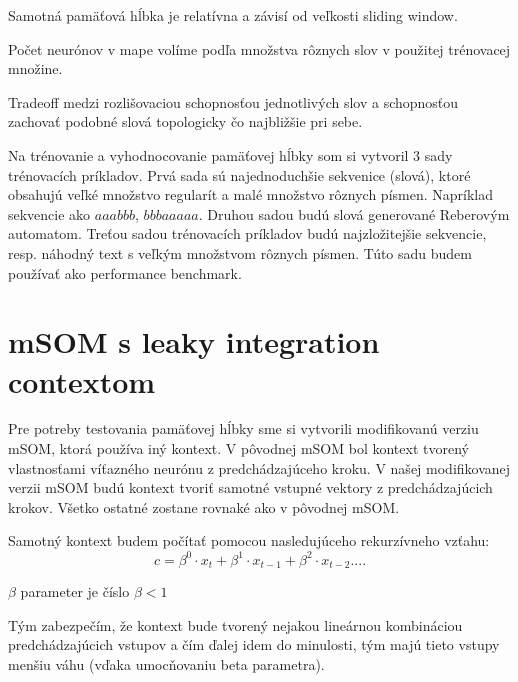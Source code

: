 Samotná pamäťová hĺbka je relatívna a závisí od veľkosti sliding window.

Počet neurónov v mape volíme podľa množstva rôznych slov v použitej trénovacej
množine.

Tradeoff medzi rozlišovaciou schopnosťou jednotlivých slov a schopnosťou
zachovať podobné slová topologicky čo najbližšie pri sebe.

Na trénovanie a vyhodnocovanie pamäťovej hĺbky som si vytvoril 3 sady 
trénovacích príkladov. 
Prvá sada sú najednoduchšie sekvenice (slová), ktoré obsahujú veľké množstvo regularít a malé množstvo rôznych písmen.
Napríklad sekvencie ako $aaabbb$,  $bbbaaaaa$.
Druhou sadou budú slová generované Reberovým automatom.
Treťou sadou trénovacích príkladov budú najzložitejšie sekvencie, resp. náhodný text s
veľkým množstvom rôznych písmen. Túto sadu budem používať ako performance benchmark. 

\section{mSOM s leaky integration contextom}
Pre potreby testovania pamäťovej hĺbky sme si vytvorili modifikovanú verziu mSOM, ktorá používa iný kontext.
V pôvodnej mSOM bol kontext tvorený vlastnosťami víťazného neurónu z predchádzajúceho kroku.
V našej modifikovanej verzii mSOM budú kontext tvoriť samotné vstupné vektory z predchádzajúcich krokov.
Všetko ostatné zostane rovnaké ako v pôvodnej mSOM.

Samotný kontext budem počítať pomocou nasledujúceho rekurzívneho vzťahu:
\begin{equation}
	c = \beta^{0} \cdot x_{t} + \beta^{1} \cdot x_{t-1} + 
	\beta^{2} \cdot x_{t-2}....
\end{equation}

$\beta$ parameter je číslo $\beta < 1$

Tým zabezpečím, že kontext bude tvorený nejakou lineárnou kombináciou 
predchádzajúcich vstupov a čím ďalej idem do minulosti, tým majú tieto vstupy 
menšiu váhu (vďaka umocňovaniu beta parametra). 




